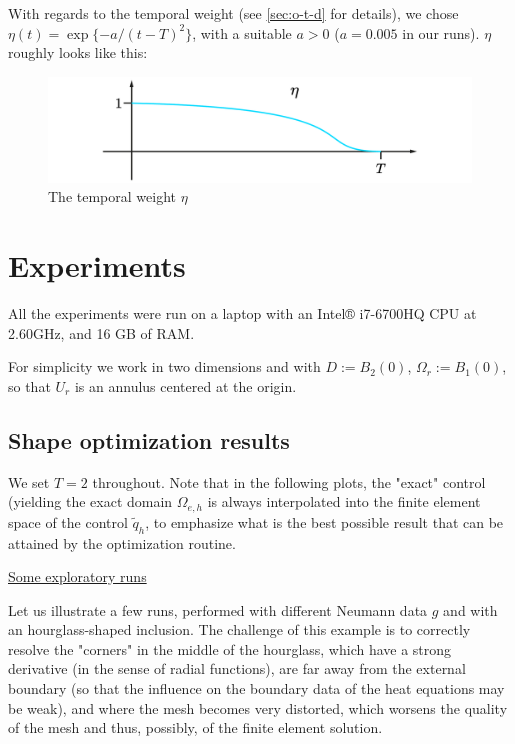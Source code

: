 \documentclass[english,a4paper,9pt,oneside]{scrbook}	%
\theoremstyle{break}
\theoremstyle{remark}
\begin{document}
With regards to the temporal weight (see \cref{sec:o-t-d} for details), we chose $\eta(t) = \exp\{-a/(t-T)^2\}$, with a suitable $a>0$ ($a=0.005$ in our runs). $\eta$ roughly looks like this:

\begin{figure}[H]
\centering
\includegraphics[width=0.5\columnwidth]{Images/Eta.pdf}
\caption{The temporal weight $\eta$}\label{fig:eta}
\end{figure}

\section{Experiments}
\label{sec:experiments}

All the experiments were run on a laptop with an Intel® i7-6700HQ CPU at 2.60GHz, and 16 GB of RAM.

For simplicity we work in two dimensions and with $D:=B_2(0)$, $\Omega_r := B_{1}(0)$, so that $U_r$ is an annulus centered at the origin. 

\subsection{Shape optimization results}

We set $T=2$ throughout. Note that in the following plots, the "exact" control (yielding the exact domain $\Omega_{e,h}$ is always interpolated into the finite element space of the control $\tilde{q}_h$, to emphasize what is the best possible result that can be attained by the optimization routine.
%

\underline{Some exploratory runs}

Let us illustrate a few runs, performed with different Neumann data $g$ and with an hourglass-shaped inclusion. The challenge of this example is to correctly resolve the "corners" in the middle of the hourglass, which have a strong derivative (in the sense of radial functions), are far away from the external boundary (so that the influence on the boundary data of the heat equations may be weak), and where the mesh becomes very distorted, which worsens the quality of the mesh and thus, possibly, of the finite element solution.
\end{document}
